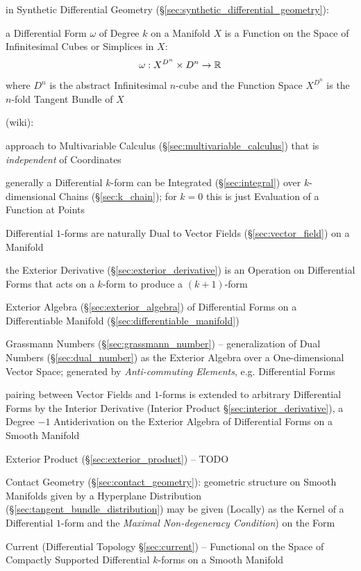 {in Synthetic Differential Geometry
(\S\ref{sec:synthetic_differential_geometry}):

a Differential Form $\omega$ of Degree $k$ on a Manifold $X$ is a Function on
the Space of Infinitesimal Cubes or Simplices in $X$:
\[
  \omega : X^{D^n} \times D^n \rightarrow \mathbb{R}
\]
where $D^n$ is the abstract Infinitesimal $n$-cube and the Function Space
$X^{D^n}$ is the $n$-fold Tangent Bundle of $X$

(wiki):

approach to Multivariable Calculus (\S\ref{sec:multivariable_calculus})
that is \emph{independent} of Coordinates

generally a Differential $k$-form can be Integrated
(\S\ref{sec:integral}) over $k$-dimensional Chains (\S\ref{sec:k_chain}); for
$k=0$ this is just Evaluation of a Function at Points

Differential $1$-forms are naturally Dual to Vector Fields
(\S\ref{sec:vector_field}) on a Manifold

the Exterior Derivative (\S\ref{sec:exterior_derivative}) is an Operation on
Differential Forms that acts on a $k$-form to produce a $(k+1)$-form

Exterior Algebra (\S\ref{sec:exterior_algebra}) of Differential Forms on a
Differentiable Manifold (\S\ref{sec:differentiable_manifold})

\fist Grassmann Numbers (\S\ref{sec:grassmann_number}) -- generalization of Dual
Numbers (\S\ref{sec:dual_number}) as the Exterior Algebra over a
One-dimensional Vector Space; generated by \emph{Anti-commuting Elements}, e.g.
Differential Forms

pairing between Vector Fields and $1$-forms is extended to arbitrary
Differential Forms by the Interior Derivative (Interior Product
\S\ref{sec:interior_derivative}), a Degree $-1$ Antiderivation on the Exterior
Algebra of Differential Forms on a Smooth Manifold

Exterior Product (\S\ref{sec:exterior_product}) -- TODO

\fist Contact Geometry (\S\ref{sec:contact_geometry}): geometric structure on
Smooth Manifolds given by a Hyperplane Distribution
(\S\ref{sec:tangent_bundle_distribution}) may be given (Locally) as the Kernel
of a Differential $1$-form and the \emph{Maximal Non-degeneracy Condition}) on
the Form

\fist Current (Differential Topology \S\ref{sec:current}) -- Functional on the
Space of Compactly Supported Differential $k$-forms on a Smooth Manifold

}
